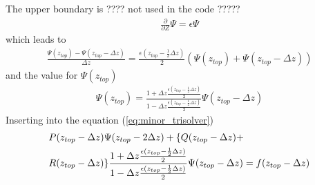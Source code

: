 The upper boundary is ???? not used in the code ?????
%
\begin{align}
 \frac{\partial}{\partial Z} \Psi = \epsilon \Psi
\end{align}
%
which leads to
%
\begin{align}
  \frac{\Psi(z_{top})-\Psi(z_{top}-\Delta z)}{\Delta z} = \frac{\epsilon(z_{top}-
   \frac{1}{2}\Delta z)}{2}\left( \Psi(z_{top}) + \Psi(z_{top} - \Delta z)\right)
\end{align}
%
and the value for $\Psi(z_{top})$
%
\begin{align}
 \Psi(z_{top}) = \frac{1+ \Delta z\frac{\epsilon(z_{top}-
   \frac{1}{2}\Delta z)}{2}}{1- \Delta z \frac{\epsilon(z_{top}-
   \frac{1}{2}\Delta z)}{2}} \Psi(z_{top} - \Delta z)
\end{align}
%
Inserting into the equation (\ref{eq:minor_trisolver})
%
\begin{align}
   & P(z_{top}-\Delta z) \Psi(z_{top}-2 \Delta z) + \{ Q(z_{top}-\Delta z)
    + \notag \\
    {} &  R(z_{top}-\Delta z)\}\frac{1+ \Delta z\frac{\epsilon(z_{top}-
   \frac{1}{2}\Delta z)}{2}}{1- \Delta z \frac{\epsilon(z_{top}-
   \frac{1}{2}\Delta z)}{2}} \Psi(z_{top} - \Delta z) = f(z_{top}-\Delta z)
\end{align}
%


